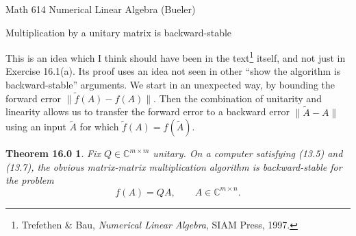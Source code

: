 \documentclass[12pt]{amsart}
\newtheorem*{thm}{Theorem 16.0}
\newcommand{\CC}{\mathbb{C}}
\begin{document}
\scriptsize \noindent Math 614 Numerical Linear Algebra (Bueler)
\normalsize

\medskip\bigskip
\Large
\centerline{Multiplication by a unitary matrix is backward-stable}

\medskip
\normalsize

\thispagestyle{empty}

This is an idea which I think should have been in the text\footnote{Trefethen \& Bau, \emph{Numerical Linear Algebra}, SIAM Press, 1997.} itself, and not just in Exercise 16.1(a).  Its proof uses an idea not seen in other ``show the algorithm is backward-stable'' arguments.  We start in an unexpected way, by bounding the forward error $\|\tilde f(A)-f(A)\|$.  Then the combination of unitarity and linearity allows us to transfer the forward error to a backward error $\|\tilde A - A\|$ using an input $\tilde A$ for which $\tilde f(A) = f(\tilde A)$.

\medskip
\begin{thm}
Fix $Q\in\CC^{m\times m}$ unitary.  On a computer satisfying (13.5) and (13.7), the obvious matrix-matrix multiplication algorithm is backward-stable for the problem
    $$f(A) = QA, \qquad A\in\CC^{m\times n}.$$
\end{thm}
\end{document}

